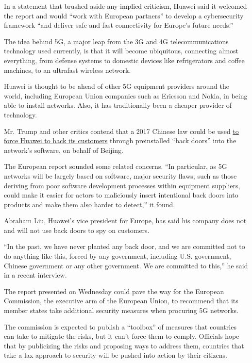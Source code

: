 In a statement that brushed aside any implied criticism, Huawei said it
welcomed the report and would ``work with European partners'' to develop
a cybersecurity framework ``and deliver safe and fast connectivity for
Europe's future needs.''

The idea behind 5G, a major leap from the 3G and 4G telecommunications
technology used currently, is that it will become ubiquitous, connecting
almost everything, from defense systems to domestic devices like
refrigerators and coffee machines, to an ultrafast wireless network.

Huawei is thought to be ahead of other 5G equipment providers around the
world, including European Union companies such as Ericsson and Nokia, in
being able to install networks. Also, it has traditionally been a
cheaper provider of technology.

Mr. Trump and other critics contend that a 2017 Chinese law could be
used
\href{https://www.nytimes.com/2019/07/05/technology/huawei-lawsuit-us-government.html}{to
force Huawei to hack its customers} through preinstalled ``back doors''
into the network's software, on behalf of Beijing.

The European report sounded some related concerns. ``In particular, as
5G networks will be largely based on software, major security flaws,
such as those deriving from poor software development processes within
equipment suppliers, could make it easier for actors to maliciously
insert intentional back doors into products and make them also harder to
detect,'' it found.

Abraham Liu, Huawei's vice president for Europe, has said his company
does not and will not use back doors to spy on customers.

``In the past, we have never planted any back door, and we are committed
not to do anything like this, forced by any government, including U.S.
government, Chinese government or any other government. We are committed
to this,'' he said in a recent interview.

The report presented on Wednesday could pave the way for the European
Commission, the executive arm of the European Union, to recommend that
its member states take additional security measures when procuring 5G
networks.

The commission is expected to publish a ``toolbox'' of measures that
countries can take to mitigate the risks, but it can't force them to
comply. Officials hope that by publicizing the risks and proposing ways
to address them, countries that take a lax approach to security will be
pushed into action by their citizens.

